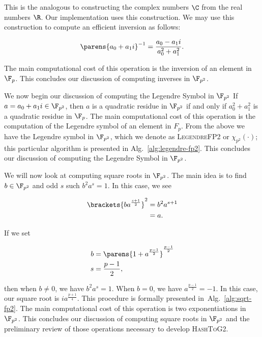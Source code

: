 \noindent
This is the analogous to constructing the complex numbers $\C$ from
the real numbers $\R$.
Our implementation uses this construction. We may use
this construction to compute an efficient inversion as follows:

\begin{equation}
    \parens{a_{0} + a_{1}i}^{-1} = \frac{a_{0}-a_{1}i}{a_{0}^{2}+a_{1}^{2}}.
\end{equation}

\noindent
The main computational cost of this operation is the inversion of an element
in $\F_{p}$.
This concludes our discussion of computing inverses in $\F_{p^{2}}$.

We now begin our discussion of computing the Legendre Symbol in $\F_{p^{2}}$
If $a = a_{0} + a_{1}i\in\F_{p^{2}}$, then $a$ is a
quadratic residue in $\F_{p^{2}}$ if and only if $a_{0}^{2} + a_{1}^{2}$
is a quadratic residue in $\F_{p}$.
The main computational cost of this operation is the computation of the Legendre
symbol of an element in $F_{p}$.
From the above we have the Legendre symbol in $\F_{p^{2}}$,
which we denote as \textsc{LegendreFP2} or $\chi_{p^{2}}(\cdot)$;
this particular algorithm is presented in
Alg.~\ref{alg:legendre-fp2}.
This concludes our discussion of computing the Legendre Symbol in
$\F_{p^{2}}$.

We will now look at computing square roots in $\F_{p^{2}}$.
The main idea is to find $b\in\F_{p^{2}}$ and odd $s$ such
$b^{2}a^{s} = 1$.
In this case, we see

\begin{align}
    \brackets{ba^{\frac{s+1}{2}}}^{2} &= b^{2}a^{s+1} \nonumber\\
        &= a.
\end{align}

\noindent
If we set

\begin{align}
    b &= \parens{1 + a^{\frac{p-1}{2}}}^{\frac{p-1}{2}} \nonumber\\
    s &= \frac{p-1}{2},
\end{align}

\noindent
then when $b\ne0$, we have $b^{2}a^{s} = 1$.
When $b=0$, we have $a^{\frac{p-1}{2}}=-1$.
In this case, our square root is $ia^{\frac{p+1}{4}}$.
This procedure is formally presented in~Alg.~\ref{alg:sqrt-fp2}.
The main computational cost of this operation is two exponentiations
in $\F_{p^{2}}$.
This concludes our discussion of computing square roots in $\F_{p^{2}}$
and the preliminary review of those operations
necessary to develop \textsc{HashToG2}.


